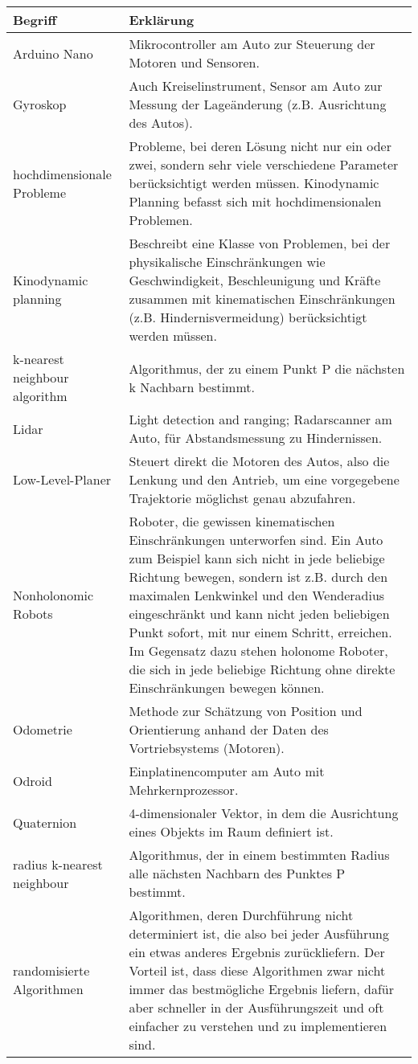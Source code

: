 \begin{tabularx}{\textwidth}{l|X}
 \textbf{Begriff}  & \textbf{Erklärung}  \\
\hline 

Arduino Nano & Mikrocontroller am Auto zur Steuerung der Motoren und Sensoren.\\
Gyroskop & Auch Kreiselinstrument, Sensor am Auto zur Messung der Lageänderung (z.B. Ausrichtung des Autos).\\
hochdimensionale Probleme & Probleme, bei deren Lösung nicht nur ein oder zwei, sondern sehr viele verschiedene Parameter berücksichtigt werden müssen. Kinodynamic Planning befasst sich mit hochdimensionalen Problemen.\\
Kinodynamic planning & Beschreibt eine Klasse von Problemen, bei der physikalische Einschränkungen wie Geschwindigkeit, Beschleunigung und Kräfte zusammen mit kinematischen Einschränkungen (z.B. Hindernisvermeidung) berücksichtigt werden müssen. \\
k-nearest neighbour algorithm & Algorithmus, der zu einem Punkt P die nächsten k Nachbarn bestimmt.\\
Lidar & Light detection and ranging; Radarscanner am Auto, für Abstandsmessung zu Hindernissen.\\
Low-Level-Planer & Steuert direkt die Motoren des Autos, also die Lenkung und den Antrieb, um eine vorgegebene Trajektorie möglichst genau abzufahren. \\
Nonholonomic Robots & Roboter, die gewissen kinematischen Einschränkungen unterworfen sind. Ein Auto zum Beispiel kann sich nicht in jede beliebige Richtung bewegen, sondern ist z.B. durch den maximalen Lenkwinkel und den Wenderadius eingeschränkt und kann nicht jeden beliebigen Punkt sofort, mit nur einem Schritt, erreichen. Im Gegensatz dazu stehen holonome Roboter, die sich in jede beliebige Richtung ohne direkte Einschränkungen bewegen können.  \\
Odometrie & Methode zur Schätzung von Position und Orientierung anhand der Daten des Vortriebsystems (Motoren).\\
Odroid & Einplatinencomputer am Auto mit Mehrkernprozessor. \\
Quaternion & 4-dimensionaler Vektor, in dem die Ausrichtung eines Objekts im Raum definiert ist.\\
radius k-nearest neighbour & Algorithmus, der in einem bestimmten Radius alle nächsten Nachbarn des Punktes P bestimmt.\\
randomisierte Algorithmen & Algorithmen, deren Durchführung nicht determiniert ist, die also bei jeder Ausführung ein etwas anderes Ergebnis zurückliefern. Der Vorteil ist, dass diese Algorithmen zwar nicht immer das bestmögliche Ergebnis liefern, dafür aber schneller in der Ausführungszeit und oft einfacher zu verstehen und zu implementieren sind.\\

\end{tabularx}
